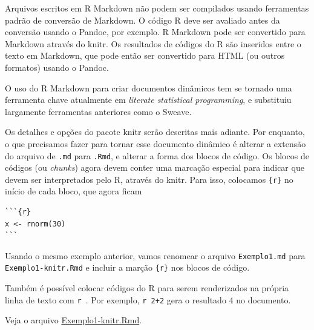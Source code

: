 \documentclass[
  10pt,
  a4paper]{book}
\begin{document}
Arquivos escritos em R Markdown não podem ser compilados usando
ferramentas padrão de conversão de Markdown. O código R deve ser
avaliado antes da conversão usando o Pandoc, por exemplo. R Markdown
pode ser convertido para Markdown através do knitr. Os resultados de
códigos do R são inseridos entre o texto em Markdown, que pode então ser
convertido para HTML (ou outros formatos) usando o Pandoc.

O uso do R Markdown para criar documentos dinâmicos tem se tornado uma
ferramenta chave atualmente em \emph{literate statistical programming}, e
substituiu largamente ferramentas anteriores como o Sweave.

Os detalhes e opções do pacote knitr serão descritas mais adiante. Por
enquanto, o que precisamos fazer para tornar esse documento dinâmico é
alterar a extensão do arquivo de \texttt{.md} para \texttt{.Rmd}, e alterar a forma
dos blocos de código. Os blocos de códigos (ou \emph{chunks}) agora devem
conter uma marcação especial para indicar que devem ser interpretados
pelo R, através do knitr. Para isso, colocamos \texttt{\{r\}} no início de cada
bloco, que agora ficam

\begin{verbatim}
```{r}
x <- rnorm(30)
```
\end{verbatim}

Usando o mesmo exemplo anterior, vamos renomear o arquivo \texttt{Exemplo1.md}
para \texttt{Exemplo1-knitr.Rmd} e incluir a marção \texttt{\{r\}} nos blocos de código.

Também é possível colocar códigos do R para serem renderizados na
própria linha de texto com \texttt{\textasciigrave{}r\ \textasciigrave{}}. Por exemplo,
\texttt{\textasciigrave{}r\ 2+2\textasciigrave{}} gera o resultado 4 no documento.

Veja o arquivo \href{exemplos/Exemplo1-knitr.Rmd}{Exemplo1-knitr.Rmd}.
\end{document}
